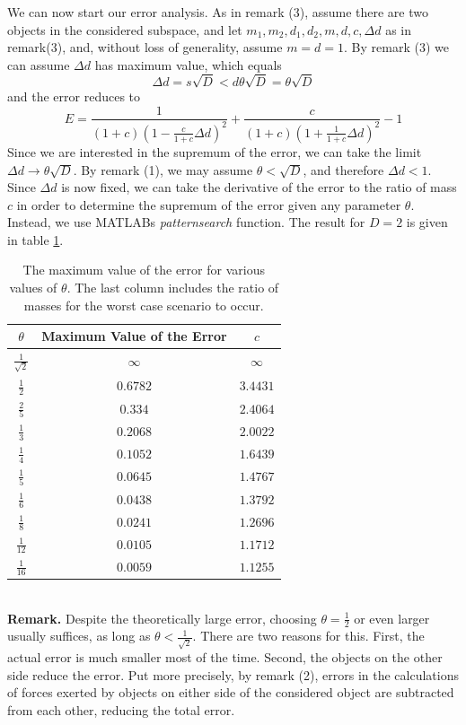 We can now start our error analysis. As in remark (3), assume there are two objects in the considered subspace, and let $m_1,m_2,d_1,d_2,m,d,c,\Delta d$ as in remark(3), and, without loss of generality, assume $m = d = 1$. By remark (3) we can assume $\Delta d$ has maximum value, which equals
\[
\Delta d = s\sqrt{D} < d\theta \sqrt{D} = \theta\sqrt{D}
\]
and the error reduces to
\[
E = \frac{1}{(1+c)(1-\frac{c}{1+c}\Delta d)^2}+\frac{c}{(1+c)(1+\frac{1}{1+c}\Delta d)^2}-1
\]
Since we are interested in the supremum of the error, we can take the limit $\Delta d \rightarrow \theta \sqrt{D}$. By remark (1), we may assume $\theta < \sqrt{D}$, and therefore $\Delta d<1$.\\
Since $\Delta d$ is now fixed, we can take the derivative of the error to the ratio of mass $c$ in order to determine the supremum of the error given any parameter $\theta$. Instead, we use MATLABs \textit{patternsearch} function. The result for $D=2$ is given in table \ref{tab:maxerror}.
\begin{table}[h!]
\centering
\caption{The maximum value of the error for various values of $\theta$. The last column includes the ratio of masses for the worst case scenario to occur.}
\label{tab:maxerror}
\begin{tabular}{c|c|c}
$\theta$ & Maximum Value of the Error & $c$\\
\hline
$\frac{1}{\sqrt{2}}$ & $\infty$ & $\infty$\\
$\frac{1}{2}$ & $0.6782$ & $3.4431$\\
$\frac{2}{5}$ & $0.334$ & $2.4064$\\
$\frac{1}{3}$ & $0.2068$ & $2.0022$\\
$\frac{1}{4}$ & $0.1052$ & $1.6439$\\
$\frac{1}{5}$ & $0.0645$ & $1.4767$\\
$\frac{1}{6}$ & $0.0438$ & $1.3792$\\
$\frac{1}{8}$ & $0.0241$ & $1.2696$\\
$\frac{1}{12}$ & $0.0105$ & $1.1712$\\
$\frac{1}{16}$ & $0.0059$ & $1.1255$ 
\end{tabular}
\end{table}\\
\textbf{Remark.} Despite the theoretically large error, choosing $\theta = \frac{1}{2}$ or even larger usually suffices, as long as $\theta < \frac{1}{\sqrt{2}}$. There are two reasons for this. First, the actual error is much smaller most of the time. Second, the objects on the other side reduce the error. Put more precisely, by remark (2), errors in the calculations of forces exerted by objects on either side of the considered object are subtracted from each other, reducing the total error.
